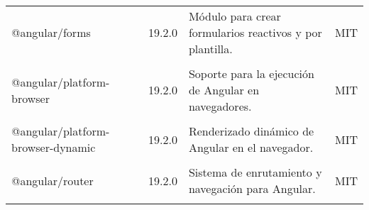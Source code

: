 \begin{longtable}[]{@{}p{}p{}p{}p{}@{}}
    \begin{minipage}[t]{0.18\columnwidth}\raggedright @angular/forms \end{minipage} & \begin{minipage}[t]{0.10\columnwidth}\raggedright 19.2.0 \end{minipage} & \begin{minipage}[t]{0.49\columnwidth}\raggedright Módulo para crear formularios reactivos y por plantilla. \end{minipage} & \begin{minipage}[t]{0.11\columnwidth}\raggedright MIT \end{minipage} \\ \tabularnewline

    \begin{minipage}[t]{0.18\columnwidth}\raggedright @angular/platform-browser \end{minipage} & \begin{minipage}[t]{0.10\columnwidth}\raggedright 19.2.0 \end{minipage} & \begin{minipage}[t]{0.49\columnwidth}\raggedright Soporte para la ejecución de Angular en navegadores. \end{minipage} & \begin{minipage}[t]{0.11\columnwidth}\raggedright MIT \end{minipage} \\ \tabularnewline

    \begin{minipage}[t]{0.18\columnwidth}\raggedright @angular/platform-browser-dynamic \end{minipage} & \begin{minipage}[t]{0.10\columnwidth}\raggedright 19.2.0 \end{minipage} & \begin{minipage}[t]{0.49\columnwidth}\raggedright Renderizado dinámico de Angular en el navegador. \end{minipage} & \begin{minipage}[t]{0.11\columnwidth}\raggedright MIT \end{minipage} \\ \tabularnewline

    \begin{minipage}[t]{0.18\columnwidth}\raggedright @angular/router \end{minipage} & \begin{minipage}[t]{0.10\columnwidth}\raggedright 19.2.0 \end{minipage} & \begin{minipage}[t]{0.49\columnwidth}\raggedright Sistema de enrutamiento y navegación para Angular. \end{minipage} & \begin{minipage}[t]{0.11\columnwidth}\raggedright MIT \end{minipage} \\ \tabularnewline


\end{longtable}
